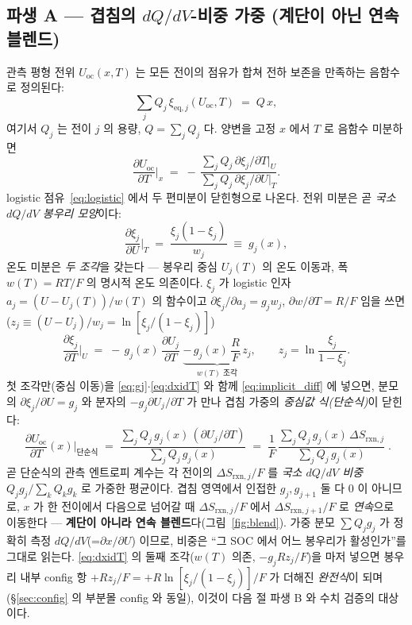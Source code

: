 \documentclass[11pt,a4paper]{article}
\newcommand{\rxn}{\mathrm{rxn}}
\newcommand{\eq}{\mathrm{eq}}
\newcommand{\oc}{\mathrm{oc}}
\begin{document}
\subsection{파생 A — 겹침의 $dQ/dV$-비중 가중 (계단이 아닌 연속 블렌드)}\label{ssec:overlap}
관측 평형 전위 $U_\oc(x,T)$ 는 모든 전이의 점유가 합쳐 전하 보존을 만족하는 음함수로 정의된다:
\begin{equation}
\sum_j Q_j\,\xi_{\eq,j}(U_\oc,T) \;=\; Q\,x,
\label{eq:implicit}
\end{equation}
여기서 $Q_j$ 는 전이 $j$ 의 용량, $Q=\sum_j Q_j$ 다. 양변을 고정 $x$ 에서 $T$ 로 음함수 미분하면
\begin{equation}
\frac{\partial U_\oc}{\partial T}\Big|_x
\;=\; -\,\frac{\sum_j Q_j\,\partial\xi_j/\partial T|_U}{\sum_j Q_j\,\partial\xi_j/\partial U|_T}.
\label{eq:implicit_diff}
\end{equation}
logistic 점유~\eqref{eq:logistic} 에서 두 편미분이 닫힌형으로 나온다. 전위 미분은 곧 \emph{국소 $dQ/dV$ 봉우리
모양}이다:
\begin{equation}
\frac{\partial\xi_j}{\partial U}\Big|_T \;=\; \frac{\xi_j(1-\xi_j)}{w_j} \;\equiv\; g_j(x),
\label{eq:gj}
\end{equation}
온도 미분은 \emph{두 조각}을 갖는다 — 봉우리 중심 $U_j(T)$ 의 온도 이동과, 폭 $w(T)=RT/F$ 의 명시적 온도
의존이다. $\xi_j$ 가 logistic 인자 $a_j=(U-U_j(T))/w(T)$ 의 함수이고 $\partial\xi_j/\partial a_j=g_j w_j$,
$\partial w/\partial T=R/F$ 임을 쓰면($z_j\equiv(U-U_j)/w_j=\ln[\xi_j/(1-\xi_j)]$)
\begin{equation}
\frac{\partial\xi_j}{\partial T}\Big|_U
\;=\; -\,g_j(x)\,\frac{\partial U_j}{\partial T}
\;\underbrace{-\,g_j(x)\,\frac{R}{F}\,z_j}_{w(T)\text{ 조각}},
\qquad z_j=\ln\frac{\xi_j}{1-\xi_j}.
\label{eq:dxidT}
\end{equation}
첫 조각만(중심 이동)을 \eqref{eq:gj}$\cdot$\eqref{eq:dxidT} 와 함께 \eqref{eq:implicit_diff} 에 넣으면, 분모의
$\partial\xi_j/\partial U=g_j$ 와 분자의 $-g_j\partial U_j/\partial T$ 가 만나 겹침 가중의 \emph{중심값 식(단순식)}이
닫힌다:
\begin{equation}
\boxed{\;\frac{\partial U_\oc}{\partial T}(x)\Big|_{\text{단순식}}
\;=\; \frac{\sum_j Q_j\,g_j(x)\,(\partial U_j/\partial T)}{\sum_j Q_j\,g_j(x)}
\;=\; \frac1F\,\frac{\sum_j Q_j\,g_j(x)\,\Delta S_{\rxn,j}}{\sum_j Q_j\,g_j(x)}\;.}
\label{eq:weighted}
\end{equation}
곧 단순식의 관측 엔트로피 계수는 각 전이의 $\Delta S_{\rxn,j}/F$ 를 \emph{국소 $dQ/dV$ 비중}
$Q_jg_j/\sum_k Q_kg_k$ 로 가중한 평균이다. 겹침 영역에서 인접한 $g_j,g_{j+1}$ 둘 다 0 이 아니므로, $x$ 가 한
전이에서 다음으로 넘어갈 때 $\Delta S_{\rxn,j}/F$ 에서 $\Delta S_{\rxn,j+1}/F$ 로 \emph{연속}으로 이동한다 —
\textbf{계단이 아니라 연속 블렌드}다(그림~\ref{fig:blend}). 가중 분모 $\sum Q_jg_j$ 가 정확히 측정 $dQ/dV$(=$\partial x/\partial U$)
이므로, 비중은 ``그 SOC 에서 어느 봉우리가 활성인가''를 그대로 읽는다. \eqref{eq:dxidT} 의 둘째 조각($w(T)$
의존, $-g_jRz_j/F$)을 마저 넣으면 봉우리 내부 config 항 $+R z_j/F=+R\ln[\xi_j/(1-\xi_j)]/F$ 가 더해진
\emph{완전식}이 되며(\S\ref{sec:config} 의 부분몰 config 와 동일), 이것이 다음 절 파생 B 와 수치 검증의 대상이다.
\end{document}
